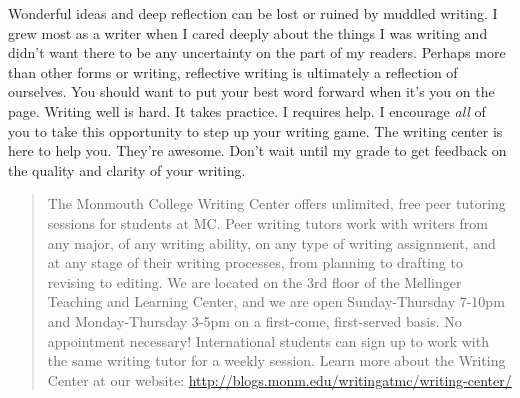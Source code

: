 \documentclass[]{tufte-handout}
\begin{document}
Wonderful ideas and deep reflection can be lost or ruined by muddled writing.  I grew most as a writer when I cared deeply about the things I was writing and didn't want there to be any uncertainty on the part of my readers. Perhaps more than other forms or writing, reflective writing is ultimately a reflection of ourselves. You should want to put your best word forward when it's you on the page. Writing well is hard. It takes practice. I requires help. I encourage \textit{all} of you to take this opportunity to step up your writing game. The writing center is here to help you. They're awesome. Don't wait until my grade to get feedback on the quality and clarity of your writing.  
\begin{quote}
The Monmouth College Writing Center offers unlimited, free peer tutoring sessions for students at MC.  Peer writing tutors work with writers from any major, of any writing ability, on any type of writing assignment, and at any stage of their writing processes, from planning to drafting to revising to editing.  We are located on the 3rd floor of the Mellinger Teaching and Learning Center, and we are open Sunday-Thursday 7-10pm and Monday-Thursday 3-5pm on a first-come, first-served basis.  No appointment necessary!  International students can sign up to work with the same writing tutor for a weekly session. Learn more about the Writing Center at our website: \url{http://blogs.monm.edu/writingatmc/writing-center/}
\end{quote}
\end{document}

